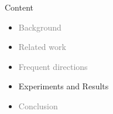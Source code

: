 \documentclass[first=dgreen,second=purple,logo=redque]{aaltoslides}
\begin{document}






\begin{frame}{Content}
\begin{itemize}
\item \textcolor{gray}{Background}
\item \textcolor{gray}{Related work}
\item \textcolor{gray}{Frequent directions}
\item Experiments and Results
\item \textcolor{gray}{Conclusion}
\end{itemize}
\end{frame}
\end{document}
